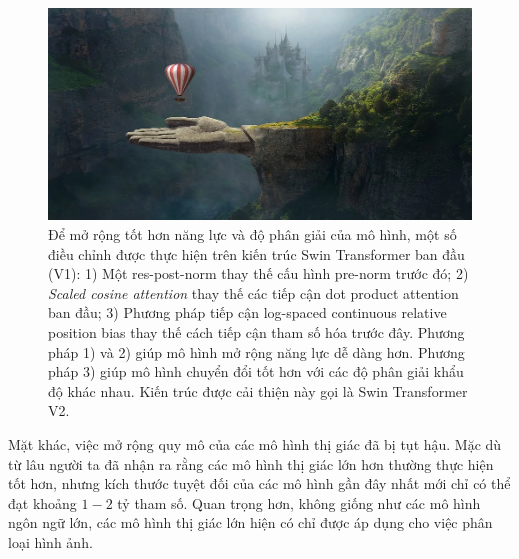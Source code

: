 \documentclass[times, twocolumn]{zHenriquesLab-StyleBioRxiv}
\begin{document}
\begin{figure}[!ht] %
    \centering
    \includegraphics[width=1\columnwidth]{1.png}
    \caption{Để mở rộng tốt hơn năng lực và độ phân giải của mô hình, một số điều chỉnh được thực hiện trên kiến trúc Swin Transformer ban đầu (V1): 1) Một res-post-norm thay thế cấu hình pre-norm trước đó; 2) \textit{Scaled cosine attention} thay thế các tiếp cận dot product attention ban đầu; 3) Phương pháp tiếp cận log-spaced continuous relative position bias thay thế cách tiếp cận tham số hóa trước đây. Phương pháp 1) và 2) giúp mô hình mở rộng năng lực dễ dàng hơn. Phương pháp 3) giúp mô hình chuyển đổi tốt hơn với các độ phân giải khẩu độ khác nhau. Kiến trúc được cải thiện này gọi là Swin Transformer V2.}
\end{figure}

Mặt khác, việc mở rộng quy mô của các mô hình thị giác đã bị tụt hậu. Mặc dù từ lâu người ta đã nhận ra rằng các mô hình thị giác lớn hơn thường thực hiện tốt hơn, nhưng kích thước tuyệt đối của các mô hình gần đây nhất mới chỉ có thể đạt khoảng $1-2$ tỷ tham số. Quan trọng hơn, không giống như các mô hình ngôn ngữ lớn, các mô hình thị giác lớn hiện có chỉ được áp dụng cho việc phân loại hình ảnh.
\end{document}
